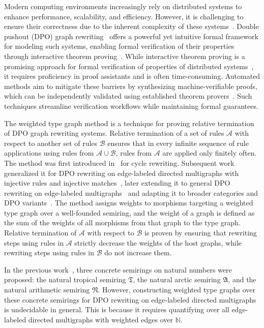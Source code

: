 Modern computing environments increasingly rely on distributed systems to enhance performance, scalability, and efficiency. 
However, it is challenging to ensure their correctness due to the inherent complexity of these systems~\cite{lamport2019thebyzantine}. 
Double pushout (DPO) graph rewriting~\cite{corradini1997algebraic,habel2001double, konig2018atutorial} offers a powerful yet intuitive formal framework for modeling such systems, enabling formal verification of their properties through interactive theorem proving~\cite{harrison2014history}.
While interactive theorem proving is a promising approach for formal verification of properties of distributed systems~\cite{plump2024formalisingDPO, potop2019formal,courtieu2016certified},  
 it requires proficiency in proof assistants and is often time-consuming. Automated methods aim to mitigate these barriers by synthesizing machine-verifiable proofs, which can be independently validated using established theorem provers~\cite{contejean2011automated}. Such techniques streamline verification workflows while maintaining formal guarantees.

 
The weighted type graph method is a technique for proving relative termination~\cite{geser1990relative} of DPO graph rewriting systems. 
Relative termination of a set of rules $\mathcal{A}$ with respect to another set of rules $\mathcal{B}$ ensures that in every infinite sequence of rule applications using rules from  $\mathcal{A} \cup \mathcal{B}$, rules from $\mathcal{A}$ are applied only finitely often. The method was first introduced in~\cite{zantema2014termination} for cycle rewriting. Subsequent work generalized it for DPO rewriting on edge-labeled directed multigraphs with injective rules and injective matches~\cite{bruggink2014termination}, later extending it to general DPO rewriting on edge-labeled multigraphs~\cite{bruggink2015proving} and adapting it to broader categories and DPO variants~\cite{endrullis2024generalized_arxiv_v2}.
The method assigns weights to morphisms targeting a weighted type graph over a well-founded semiring, and the weight of a graph is defined
 as the sum of the weights of all morphisms from that graph to the type graph. Relative termination of $\mathcal{A}$ with respect to $\mathcal{B}$ is proven by ensuring that rewriting steps using rules in \( \mathcal{A} \) strictly decrease the weights of the host graphs, while rewriting steps using rules in \( \mathcal{B} \) do not increase them.
   
    In the previous work~\cite{zantema2014termination,bruggink2014termination,bruggink2015proving}, three concrete semirings on natural numbers were proposed: the natural tropical semiring $\mathfrak{T}$, the natural arctic semiring $\mathfrak{A}$, and the natural arithmetic semiring $\mathfrak{N}$.
    However, constructing weighted type graphs over these concrete semirings for DPO rewriting on edge-labeled directed multigraphs is undecidable in general. This is because it requires quantifying over all edge-labeled directed multigraphs with weighted edges over $\mathbb{N}$. 

